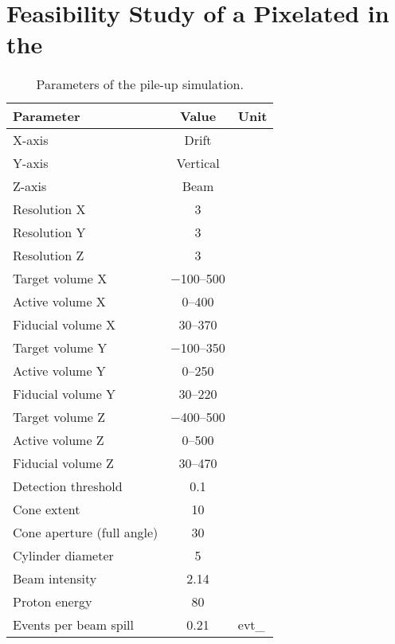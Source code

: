 \section{Feasibility Study of a Pixelated  in the }
\label{sec:dune-nd_pile-up-study}

\begin{table}[htb]
	\centering
	\caption[  pile-up simulation parameters]{%
		Parameters of the \Pgpz pile-up simulation.
	}
	\label{tab:dune-nd_pile-up-params}
	\begin{tabu} to \textwidth {lSs}
		\toprule
		Parameter &						{Value} &				{Unit} \\
		\midrule
		X-axis &						{Drift} &				\\
		Y-axis &						{Vertical} &			\\
		Z-axis &						{Beam} &				\\
		Resolution X &					3 &						\milli\metre \\
		Resolution Y &					3 &						\milli\metre \\
		Resolution Z &					3 &						\milli\metre \\
		Target volume X &				\numrange{-100}{500} &	\centi\metre \\
		Active volume X &				\numrange{0}{400} &		\centi\metre \\
		Fiducial volume X &				\numrange{30}{370} &	\centi\metre \\
		Target volume Y &				\numrange{-100}{350} &	\centi\metre \\
		Active volume Y &				\numrange{0}{250} &		\centi\metre \\
		Fiducial volume Y &				\numrange{30}{220} &	\centi\metre \\
		Target volume Z &				\numrange{-400}{500} &	\centi\metre \\
		Active volume Z &				\numrange{0}{500} &		\centi\metre \\
		Fiducial volume Z &				\numrange{30}{470} &	\centi\metre \\
		Detection threshold &			0.1 &					\mega\electronvolt \\
		Cone extent &					10 &				 	\radlen \\
		Cone aperture (full angle) &	30 &					\degree \\
		Cylinder diameter &				5 &						\centi\metre \\
		Beam intensity &				2.14 &					\mega\watt \\
		Proton energy &					80 &					\giga\electronvolt \\
		Events per beam spill &			0.21 &					evt\per\tonne_{} \\
		\bottomrule
	\end{tabu}
\end{table}

